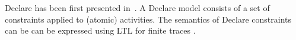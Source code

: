 Declare has been first presented in~\cite{Pesic2007:DECLARE}.
A Declare model consists of a set of constraints applied to (atomic) activities.
The semantics of Declare constraints can be can be expressed using LTL for finite traces \cite{DBLP:conf/ijcai/GiacomoV13}. %




%
%
%
%
%

